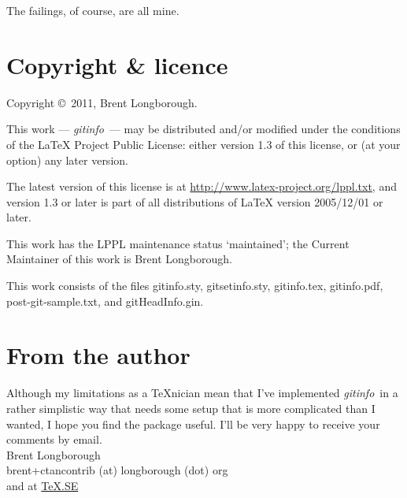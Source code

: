 \documentclass[a4paper,12pt,twoside,openany]{memoir}
\newcommand{\sfit}[1]{\textit{#1}}
\newcommand{\tpname}{\sfit{gitinfo}}
\newcommand{\ginname}{gitHeadInfo.gin}
\begin{document}
The failings, of course, are all mine.
\section{Copyright \& licence}
Copyright \copyright\ 2011, Brent Longborough.

This work --- \tpname\ --- may be distributed and/or modified under the
conditions of the LaTeX Project Public License: either version 1.3
of this license, or (at your option) any later version.

The latest version of this license is at
\url{http://www.latex-project.org/lppl.txt},
and version 1.3 or later is part of all distributions of \LaTeX
version 2005/12/01 or later.

This work has the LPPL maintenance status `maintained';
the Current Maintainer of this work is Brent Longborough.

This work consists of the files 
gitinfo.sty, gitsetinfo.sty, gitinfo.tex, gitinfo.pdf,
post-git-sample.txt, and \ginname.

\section{From the author}
Although my limitations as a \TeX nician
mean that I've implemented \tpname\ in a rather simplistic way
that needs some setup that is more complicated than I wanted,
I hope you find the package useful.
I'll be very happy to receive your comments by email.\\[\baselineskip]
Brent Longborough\\[\baselineskip]
\textsf{brent+ctancontrib (at) longborough (dot) org}\\
and at \href{http://tex.stackexchange.com/users/344/brent-longborough}{\TeX.SE}
\end{document}
